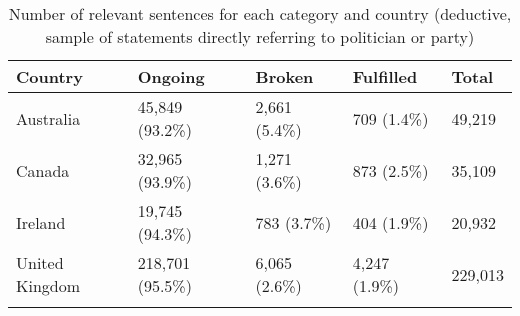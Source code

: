 \begingroup\footnotesize
\begin{longtable}{p{}p{}p{}p{}p{}}
\caption{Number of relevant sentences for each category and country (deductive, sample of statements directly referring to politician or party)} \\ 
  \hline
Country & Ongoing & Broken & Fulfilled & Total \\ 
  \hline 
\endhead 
\hline 
\endfoot 
\endlastfoot 
Australia & 45,849 (93.2\%) & 2,661 (5.4\%) & 709 (1.4\%) & 49,219 \\ 
  Canada & 32,965 (93.9\%) & 1,271 (3.6\%) & 873 (2.5\%) & 35,109 \\ 
  Ireland & 19,745 (94.3\%) & 783 (3.7\%) & 404 (1.9\%) & 20,932 \\ 
  United Kingdom & 218,701 (95.5\%) & 6,065 (2.6\%) & 4,247 (1.9\%) & 229,013 \\ 
  \hline
\label{tab:articles_deductive_partymp}
\end{longtable}
\endgroup
